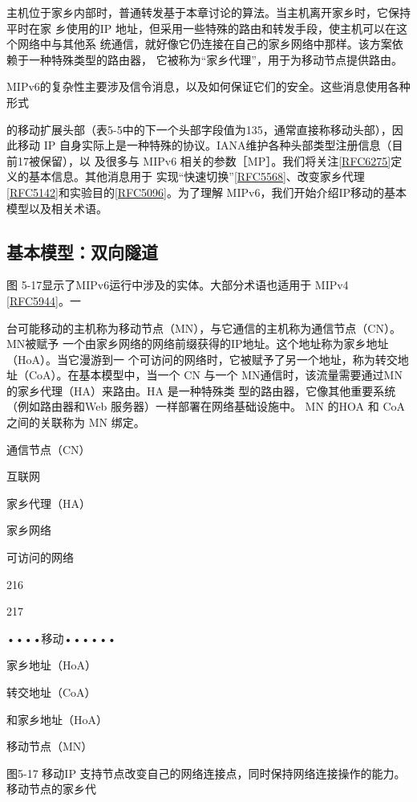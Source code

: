 主机位于家乡内部时，普通转发基于本章讨论的算法。当主机离开家乡时，它保持平时在家
乡使用的IP 地址，但采用一些特殊的路由和转发手段，使主机可以在这个网络中与其他系
统通信，就好像它仍连接在自己的家乡网络中那样。该方案依赖于一种特殊类型的路由器，
它被称为“家乡代理”，用于为移动节点提供路由。

MIPv6的复杂性主要涉及信令消息，以及如何保证它们的安全。这些消息使用各种形式

的移动扩展头部（表5-5中的下一个头部字段值为135，通常直接称移动头部），因此移动
IP 自身实际上是一种特殊的协议。IANA维护各种头部类型注册信息（目前17被保留），以
及很多与 MIPv6 相关的参数［MP］。我们将关注\href{https://www.rfc-editor.org/rfc/rfc6275}{[RFC6275]}定义的基本信息。其他消息用于
实现“快速切换”\href{https://www.rfc-editor.org/rfc/rfc5568}{[RFC5568]}、改变家乡代理\href{https://www.rfc-editor.org/rfc/rfc5142}{[RFC5142]}和实验目的\href{https://www.rfc-editor.org/rfc/rfc5096}{[RFC5096]}。为了理解
MIPv6，我们开始介绍IP移动的基本模型以及相关术语。

\subsection{基本模型：双向隧道}
图 5-17显示了MIPv6运行中涉及的实体。大部分术语也适用于 MIPv4 \href{https://www.rfc-editor.org/rfc/rfc5944}{[RFC5944]}。一

台可能移动的主机称为移动节点（MN），与它通信的主机称为通信节点（CN）。MN被赋予
一个由家乡网络的网络前缀获得的IP地址。这个地址称为家乡地址（HoA）。当它漫游到一
个可访问的网络时，它被赋予了另一个地址，称为转交地址（CoA）。在基本模型中，当一个
CN 与一个 MN通信时，该流量需要通过MN 的家乡代理（HA）来路由。HA 是一种特殊类
型的路由器，它像其他重要系统（例如路由器和Web 服务器）一样部署在网络基础设施中。
MN 的HOA 和 CoA之间的关联称为 MN 绑定。

通信节点（CN）

互联网

家乡代理（HA）

家乡网络

可访问的网络

216

217

••••移动••••••

家乡地址（HoA）

转交地址（CoA）

和家乡地址（HoA）

移动节点（MN）

图5-17 移动IP 支持节点改变自己的网络连接点，同时保持网络连接操作的能力。移动节点的家乡代

